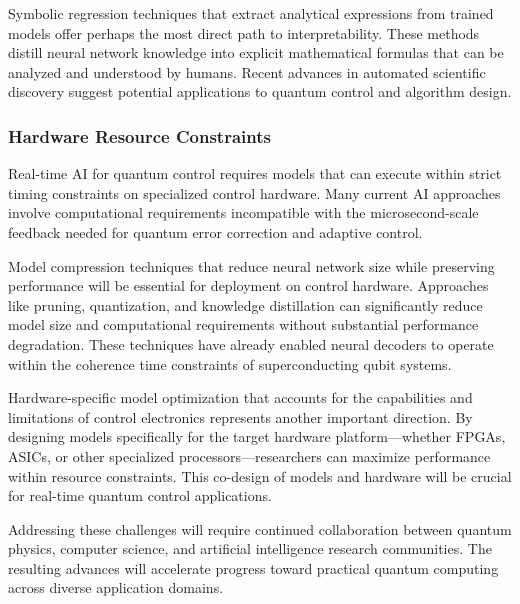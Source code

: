 Symbolic regression techniques that extract analytical expressions from trained models offer perhaps the most direct path to interpretability. These methods distill neural network knowledge into explicit mathematical formulas that can be analyzed and understood by humans. Recent advances in automated scientific discovery suggest potential applications to quantum control and algorithm design.

\subsubsection{Hardware Resource Constraints}

Real-time AI for quantum control requires models that can execute within strict timing constraints on specialized control hardware. Many current AI approaches involve computational requirements incompatible with the microsecond-scale feedback needed for quantum error correction and adaptive control.

Model compression techniques that reduce neural network size while preserving performance will be essential for deployment on control hardware. Approaches like pruning, quantization, and knowledge distillation can significantly reduce model size and computational requirements without substantial performance degradation. These techniques have already enabled neural decoders to operate within the coherence time constraints of superconducting qubit systems.

Hardware-specific model optimization that accounts for the capabilities and limitations of control electronics represents another important direction. By designing models specifically for the target hardware platform—whether FPGAs, ASICs, or other specialized processors—researchers can maximize performance within resource constraints. This co-design of models and hardware will be crucial for real-time quantum control applications.

Addressing these challenges will require continued collaboration between quantum physics, computer science, and artificial intelligence research communities. The resulting advances will accelerate progress toward practical quantum computing across diverse application domains. 